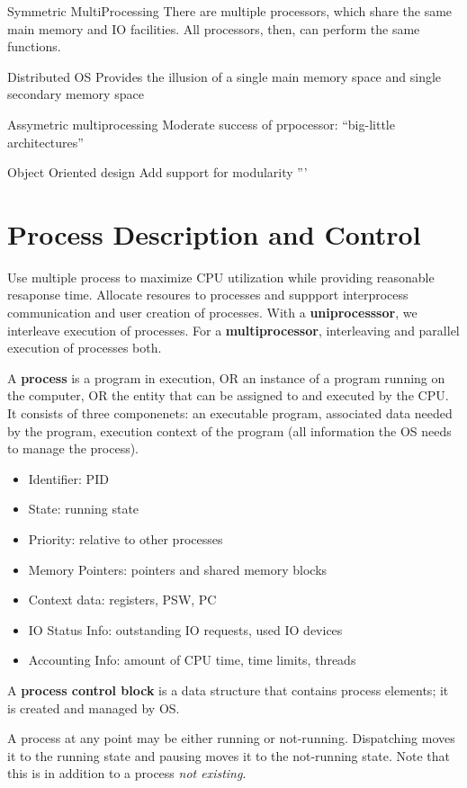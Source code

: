 \documentclass[12pt]{article}
\begin{document}
Symmetric MultiProcessing
There are multiple processors, which share the same main memory and IO facilities. All processors, then, can perform the same functions.

Distributed OS
Provides the illusion of a single main memory space and single secondary memory space

Assymetric multiprocessing
Moderate success of prpocessor: ``big-little architectures''

Object Oriented design
Add support for modularity
'''

\section{Process Description and Control}
Use multiple process to maximize CPU utilization while providing reasonable resaponse time. Allocate resoures to processes and suppport interprocess communication and user creation of processes. With a {\bf uniprocesssor}, we interleave execution of processes. For a {\bf multiprocessor}, interleaving and parallel execution of processes both.

A {\bf process} is a program in execution, OR an instance of a program running on the computer, OR the entity that can be assigned to and executed by the CPU. It consists of three componenets: an executable program, associated data needed by the program, execution context of the program (all information the OS needs to manage the process).
\begin{itemize}
\item Identifier: PID
\item State: running state
\item Priority: relative to other processes
\item Memory Pointers: pointers and shared memory blocks
\item Context data: registers, PSW, PC
\item IO Status Info: outstanding IO requests, used IO devices
\item Accounting Info: amount of CPU time, time limits, threads
\end{itemize}

A {\bf process control block} is a data structure that contains process elements; it is created and managed by OS.

A process at any point may be either running or not-running. Dispatching moves it to the running state and pausing moves it to the not-running state. Note that this is in addition to a process \emph{not existing}.
\end{document}
